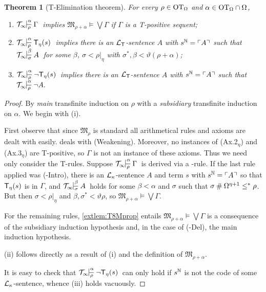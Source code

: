 \documentclass[UKenglish,cleveref,DIV=12]{scrartcl}
\newtheorem{theorem}{Theorem}
\theoremstyle{definition}
\theoremstyle{definition}
\begin{document}
\begin{theorem}[T-Elimination theorem]\label{extlem:T8model}\label{extlem:T8TElim}
For every $\rho\in\mathrm{OT}_\Omega$ and $\alpha\in\mathrm{OT}_\Omega\cap\Omega$,
\begin{enumerate}
 \item $\Tinfty\prov\alpha\rho\Gamma$ implies $\mathfrak
	M_{\rho+\alpha}\models\bigvee\Gamma$  if $\Gamma$ is a T-positive sequent;
 \item $\Tinfty\prov\alpha\rho{\T_\eta(s)}$ implies there is an $\mathcal{L}_{\mathsf{T}}$-sentence $A$ with $s^\mathbb N=\ulcorner{A}\urcorner$ such that $\Tinfty\prov\beta\sigma A$ for some $\beta$, $\sigma<\rho|_\eta$ with $\sigma^*,\beta<\vartheta(\rho+\alpha)$;
  \item $\Tinfty\prov\alpha\rho{\lnot \T_\eta(s)}$ implies there is an $\mathcal{L}_{\mathsf{T}}$-sentence $A$ with $s^\mathbb N=\ulcorner{A}\urcorner$ such that $\Tinfty\prov\alpha\rho {\lnot A.}$
\end{enumerate}
\end{theorem}
\begin{proof} By {\em main} transfinite induction on $\rho$ with a {\em subsidiary} transfinite induction on $\alpha$. We begin with (i).

First observe that since $\mathfrak M_\rho$ is standard all
arithmetical rules and axioms are dealt with easily.  deals
with (Weakening). Moreover, no instances of (Ax.2$_\eta$) and
(Ax.3$_\eta$) are T-positive, so $\Gamma$ is not an instance of these axioms. Thus
we need only consider the T-rules. Suppose $\Tinfty\prov\alpha\rho\Gamma$
is derived via a \textT\eta-rule. If the last rule applied was
(\textT\eta-Intro), there is an $\mathcal{L}_\kappa$-sentence $A$ and term $s$ with
$s^\mathbb N=\ulcorner{A}\urcorner$ so that $\mathsf{T}_\eta(s)$ is in $\Gamma$, and $\Tinfty\prov\beta\sigma A$
holds for some $\beta<\alpha$ and $\sigma$ such that
$\sigma\mathbin{\#}\Omega^{\eta+1}\le^*\rho$. But then $\sigma<\rho|_\eta$ and $\beta,\sigma^*<\vartheta\rho$, so $\mathfrak{M}_{\rho+\alpha}\models\bigvee\Gamma$.

For the remaining rules, \cref{extlem:T8Mprop} entails $\mathfrak M_{\rho+\alpha}\models\bigvee\Gamma$ is a consequence of the subsidiary induction hypothesis and, in the case of (\textT\eta-Del), the main induction hypothesis.

(ii) follows directly as a result of (i) and the definition of $\mathfrak M_{\rho+\alpha}$.

It is easy to check that $\Tinfty\prov\alpha\rho{\lnot \T_\eta(s)}$ can only hold
if $s^\mathbb N$ is not the code of some $\mathcal{L}_\kappa$-sentence, whence (iii) holds
vacuously.
\end{proof}
\end{document}
